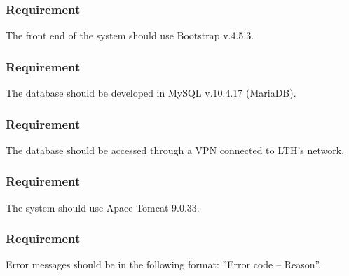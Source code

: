 \documentclass{article}
\begin{document}
\subsubsection{Requirement}
The front end of the system should use Bootstrap v.4.5.3.

\subsubsection{Requirement}
The database should be developed in MySQL v.10.4.17 (MariaDB).

\subsubsection{Requirement}
The database should be accessed through a VPN connected to LTH's network.

\subsubsection{Requirement}
The system should use Apace Tomcat 9.0.33.

\subsubsection{Requirement}
Error messages should be in the following format: ”Error code – Reason”.
\end{document}
